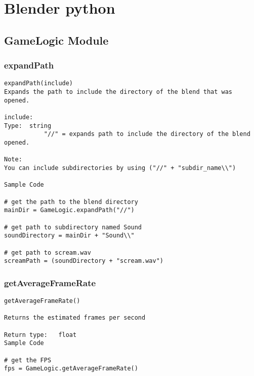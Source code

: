 \chapter{Blender python}

\section{GameLogic Module}

\subsection{expandPath}

\begin{verbatim}
expandPath(include)
Expands the path to include the directory of the blend that was opened.

include:
Type:  string
           "//" = expands path to include the directory of the blend opened.

Note:
You can include subdirectories by using ("//" + "subdir_name\\")

Sample Code

# get the path to the blend directory
mainDir = GameLogic.expandPath("//")

# get path to subdirectory named Sound
soundDirectory = mainDir + "Sound\\"

# get path to scream.wav
screamPath = (soundDirectory + "scream.wav")
\end{verbatim}


\subsection{getAverageFrameRate}

\begin{verbatim}
getAverageFrameRate()

Returns the estimated frames per second

Return type:   float
Sample Code

# get the FPS
fps = GameLogic.getAverageFrameRate()
\end{verbatim}

